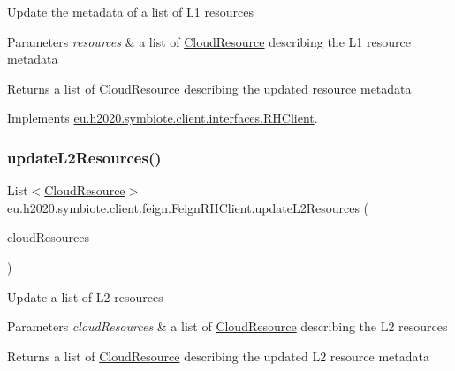 Update the metadata of a list of L1 resources


\begin{DoxyParams}{Parameters}
{\em resources} & a list of \hyperlink{}{Cloud\+Resource} describing the L1 resource metadata \\
\hline
\end{DoxyParams}
\begin{DoxyReturn}{Returns}
a list of \hyperlink{}{Cloud\+Resource} describing the updated resource metadata 
\end{DoxyReturn}


Implements \hyperlink{interfaceeu_1_1h2020_1_1symbiote_1_1client_1_1interfaces_1_1RHClient_a91c3ca12af4ec03fb196736953b690db}{eu.\+h2020.\+symbiote.\+client.\+interfaces.\+R\+H\+Client}.

\mbox{\label{classeu_1_1h2020_1_1symbiote_1_1client_1_1feign_1_1FeignRHClient_ae87c958e721ee8f5144822c10dd40095}} 
\subsubsection{\texorpdfstring{update\+L2\+Resources()}{updateL2Resources()}}
{\footnotesize\ttfamily List$<$\hyperlink{classeu_1_1h2020_1_1symbiote_1_1cloud_1_1model_1_1internal_1_1CloudResource}{Cloud\+Resource}$>$ eu.\+h2020.\+symbiote.\+client.\+feign.\+Feign\+R\+H\+Client.\+update\+L2\+Resources (\begin{DoxyParamCaption}\item[{List$<$ \hyperlink{classeu_1_1h2020_1_1symbiote_1_1cloud_1_1model_1_1internal_1_1CloudResource}{Cloud\+Resource} $>$}]{cloud\+Resources }\end{DoxyParamCaption})}

Update a list of L2 resources


\begin{DoxyParams}{Parameters}
{\em cloud\+Resources} & a list of \hyperlink{}{Cloud\+Resource} describing the L2 resources \\
\hline
\end{DoxyParams}
\begin{DoxyReturn}{Returns}
a list of \hyperlink{}{Cloud\+Resource} describing the updated L2 resource metadata 
\end{DoxyReturn}


